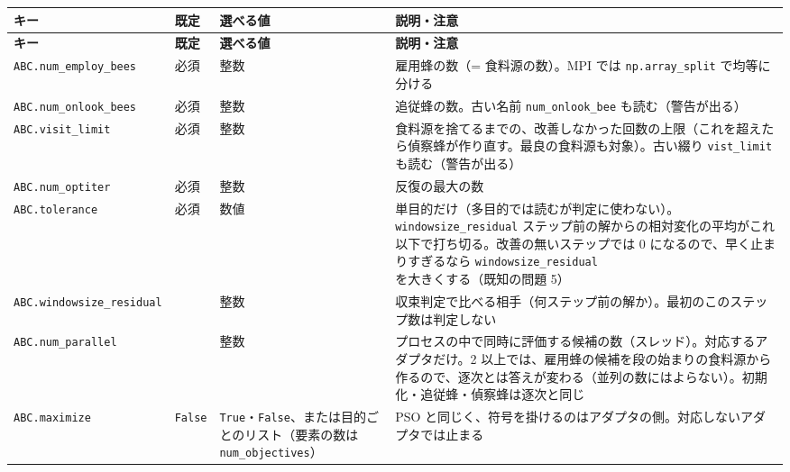 \begingroup\small
\begin{longtable}{>{\raggedright\arraybackslash}p{}>{\raggedright\arraybackslash}p{}>{\raggedright\arraybackslash}p{}>{\raggedright\arraybackslash}p{}}
\toprule
\textbf{キー} & \textbf{既定} & \textbf{選べる値} & \textbf{説明・注意} \\
\midrule
\endfirsthead
\toprule
\textbf{キー} & \textbf{既定} & \textbf{選べる値} & \textbf{説明・注意} \\
\midrule
\endhead
\bottomrule
\endlastfoot
\texttt{ABC.\allowbreak{}num\_\allowbreak{}employ\_\allowbreak{}bees} & 必須 & 整数 & 雇用蜂の数（= 食料源の数）。MPI では \texttt{np.\allowbreak{}array\_\allowbreak{}split} で均等に分ける \\
\texttt{ABC.\allowbreak{}num\_\allowbreak{}onlook\_\allowbreak{}bees} & 必須 & 整数 & 追従蜂の数。古い名前 \texttt{num\_\allowbreak{}onlook\_\allowbreak{}bee} も読む（警告が出る） \\
\texttt{ABC.\allowbreak{}visit\_\allowbreak{}limit} & 必須 & 整数 & 食料源を捨てるまでの、改善しなかった回数の上限（これを超えたら偵察蜂が作り直す。最良の食料源も対象）。古い綴り \texttt{vist\_\allowbreak{}limit} も読む（警告が出る） \\
\texttt{ABC.\allowbreak{}num\_\allowbreak{}optiter} & 必須 & 整数 & 反復の最大の数 \\
\texttt{ABC.\allowbreak{}tolerance} & 必須 & 数値 & 単目的だけ（多目的では読むが判定に使わない）。\texttt{windowsize\_\allowbreak{}residual} ステップ前の解からの相対変化の平均がこれ以下で打ち切る。改善の無いステップでは 0 になるので、早く止まりすぎるなら \texttt{windowsize\_\allowbreak{}residual} を大きくする（既知の問題 5） \\
\texttt{ABC.\allowbreak{}windowsize\_\allowbreak{}residual} & 1 & 整数 & 収束判定で比べる相手（何ステップ前の解か）。最初のこのステップ数は判定しない \\
\texttt{ABC.\allowbreak{}num\_\allowbreak{}parallel} & 1 & 整数 & 1 プロセスの中で同時に評価する候補の数（スレッド）。対応するアダプタだけ。2 以上では、雇用蜂の候補を段の始まりの食料源から作るので、逐次とは答えが変わる（並列の数にはよらない）。初期化・追従蜂・偵察蜂は逐次と同じ \\
\texttt{ABC.\allowbreak{}maximize} & \texttt{False} & \texttt{True}・\texttt{False}、または目的ごとのリスト（要素の数は \texttt{num\_\allowbreak{}objectives}） & PSO と同じく、符号を掛けるのはアダプタの側。対応しないアダプタでは止まる \\

\end{longtable}
